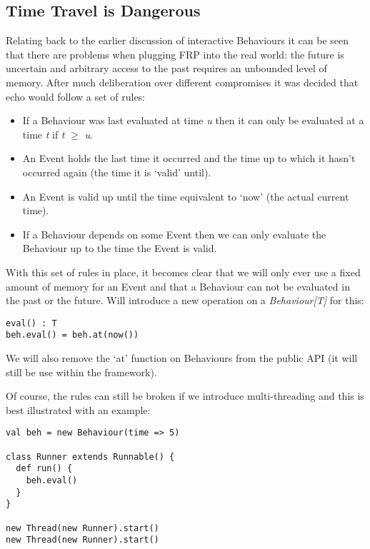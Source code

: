     \subsection{Time Travel is Dangerous}
      Relating back to the earlier discussion of interactive Behaviours it can be seen
      that there are problems when plugging FRP into the real world: the future is uncertain and
      arbitrary access to the past requires an unbounded level of memory. After much deliberation
      over different compromises it was decided that echo would follow a set of rules:
      
      \begin{itemize}
        \item If a Behaviour was last evaluated at time \emph{u} then it can only be evaluated at
        a time \emph{t} if \emph{t} $\geq$ \emph{u}.
        \item An Event holds the last time it occurred and the time up to which it hasn't occurred
        again (the time it is `valid' until).
        \item An Event is valid up until the time equivalent to `now' (the actual current time).
        \item If a Behaviour depends on some Event then we can only evaluate the Behaviour up to
        the time the Event is valid.
      \end{itemize}
      
      With this set of rules in place, it becomes clear that we will only ever use a fixed amount of memory
      for an Event and that a Behaviour can not be evaluated in the past or the future. Will
      introduce a new operation on a \emph{Behaviour[T]} for this:

\begin{verbatim}
eval() : T
beh.eval() = beh.at(now())
\end{verbatim}       

      We will also remove the `at' function on Behaviours from the public API (it will still be
      use within the framework). 
      
      Of course, the rules can still be broken if we introduce multi-threading and this is best illustrated
      with an example:
      
\begin{verbatim}
val beh = new Behaviour(time => 5)

class Runner extends Runnable() {
  def run() {
    beh.eval()
  }
}

new Thread(new Runner).start()
new Thread(new Runner).start()
\end{verbatim}       

